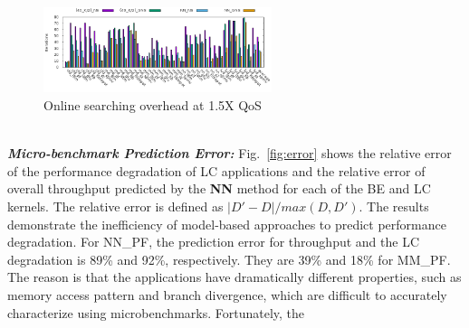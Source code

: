     \begin{figure}
    \vspace{-0.5cm}
        \centering
        \includegraphics[width=\textwidth, height=2.5cm]{figures/oh_res_15.png}
        \caption{Online searching overhead at 1.5X QoS}
        \label{fig:overhead-results}
        \vspace{-0.6cm}
    \end{figure}\\
\textbf{\textit{Micro-benchmark Prediction Error:}}
Fig.~\ref{fig:error} shows the relative error of the performance degradation of LC applications and the relative error of overall throughput predicted
by the \textbf{NN} method for each of the BE and LC kernels. %
The relative error is
defined as $|D'-D|/max(D, D')$. The results demonstrate the inefficiency of %
model-based approaches to predict performance degradation. For NN\_PF, the prediction
error for %
throughput %
and the LC degradation is 
89\% and 92\%, respectively. 
 They are  39\% and 18\% for MM\_PF. The reason is that the applications have
dramatically different properties, such as memory access pattern and branch divergence,
which are difficult to accurately characterize using microbenchmarks. Fortunately, the 
